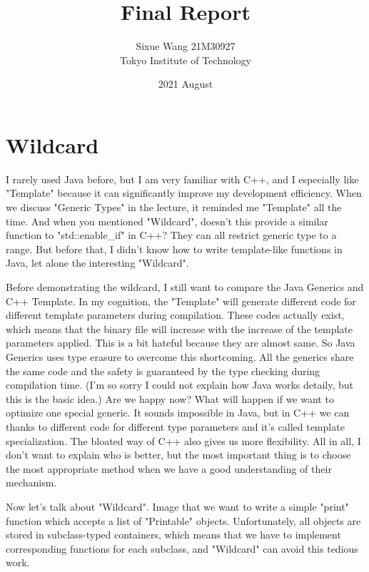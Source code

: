 \documentclass{article}
\title{Final Report}
\date{2021 August}
\author{Sixue Wang 21M30927\\Tokyo Institute of Technology}
\begin{document}
\maketitle

\section{Wildcard}
I rarely used Java before, but I am very familiar with C++, and I especially like "Template" because it can significantly improve my development efficiency. When we discuss "Generic Types" in the lecture, it reminded me "Template" all the time. And when you mentioned "Wildcard", doesn't this provide a similar function to "std::enable\_if" in C++? They can all restrict generic type to a range. But before that, I didn’t know how to write template-like functions in Java, let alone the interesting "Wildcard".

Before demonstrating the wildcard, I still want to compare the Java Generics and C++ Template. In my cognition, the "Template" will generate different code for different template parameters during compilation. These codes actually exist, which means that the binary file will increase with the increase of the template parameters applied. This is a bit hateful because they are almost same. So Java Generics uses type erasure to overcome this shortcoming. All the generics share the same code and the safety is guaranteed by the type checking during compilation time. (I'm so sorry I could not explain how Java works detaily, but this is the basic idea.) Are we happy now? What will happen if we want to optimize one special generic. It sounds impossible in Java, but in C++ we can thanks to different code for different type parameters and it's called template specialization. The bloated way of C++ also gives us more flexibility. All in all, I don't want to explain who is better, but the most important thing is to choose the most appropriate method when we have a good understanding of their mechanism.

Now let's talk about "Wildcard". Image that we want to write a simple "print" function which accepts a list of "Printable" objects. Unfortunately, all objects are stored in subclass-typed containers, which means that we have to implement corresponding functions for each subclass, and "Wildcard" can avoid this tedious work.
\end{document}
